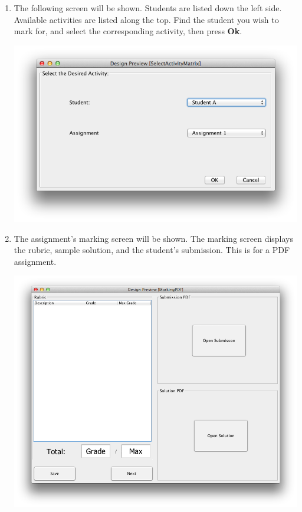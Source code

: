 \documentclass{article}
\begin{document}
\begin{enumerate}
\begin{center}
     \label{courseSel}
    \end{center}
  \item The following screen will be shown.  Students are listed down the left
    side. Available activities are listed along the top.  Find the student you
    wish to mark for, and select the corresponding activity, then press \textbf{Ok}.
  \begin{center} 
    \includegraphics[scale=0.55]{../images/UpdatedUIScreens/mARKINGActivitySelection.png}
    \label{actSel}
  \end{center}
  \item The assignment's marking screen will be shown.  The marking screen
    displays the rubric, sample solution, and the student's submission. This is for a PDF assignment.
  \begin{center} 
   \includegraphics[scale=0.55]{../images/UpdatedUIScreens/MarkingPDF.png}

\end{center}
\end{enumerate}
\end{document}
